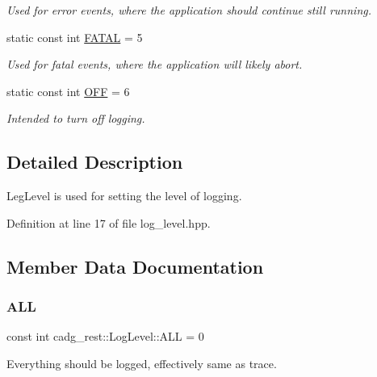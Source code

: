 \begin{DoxyCompactItemize}
\begin{DoxyCompactList}\small\item\em Used for error events, where the application should continue still running. \end{DoxyCompactList}\item 
static const int \mbox{\hyperlink{structcadg__rest_1_1_log_level_a4449c46de023e43f20ee39150715957a}{F\+A\+T\+AL}} = 5
\begin{DoxyCompactList}\small\item\em Used for fatal events, where the application will likely abort. \end{DoxyCompactList}\item 
static const int \mbox{\hyperlink{structcadg__rest_1_1_log_level_a9b50615df04a7600bf4f87cb06952f3d}{O\+FF}} = 6
\begin{DoxyCompactList}\small\item\em Intended to turn off logging. \end{DoxyCompactList}\end{DoxyCompactItemize}


\subsection{Detailed Description}
Leg\+Level is used for setting the level of logging. 

Definition at line 17 of file log\+\_\+level.\+hpp.



\subsection{Member Data Documentation}
\mbox{\label{structcadg__rest_1_1_log_level_af386ba1f5d4bf541fa52e236a2993462}} 
\subsubsection{\texorpdfstring{ALL}{ALL}}
{\footnotesize\ttfamily const int cadg\+\_\+rest\+::\+Log\+Level\+::\+A\+LL = 0\hspace{0.3cm}{\ttfamily [static]}}



Everything should be logged, effectively same as trace. 




